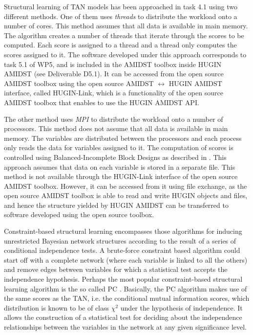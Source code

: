 Structural learning of TAN models has been approached in task 4.1 using two different methods.
One of them uses \emph{threads} to distribute the workload onto a number of cores. This method assumes that all data is 
available in main memory. The algorithm creates a number of threads that iterate through the scores to be computed. 
Each score is assigned to a thread and a thread only computes the scores assigned to it.
The software developed under this approach corresponds to task 5.1 of WP5, and is included in the AMIDST toolbox 
inside HUGIN AMIDST (see Deliverable D5.1). It can be accessed from the open source AMIDST toolbox using the 
open source AMIDST $\leftrightarrow$ HUGIN AMIDST interface, called HUGIN-Link, which is a functionality of the open
source AMIDST toolbox that  enables to use the HUGIN AMIDST API.

The other method uses \emph{MPI} \cite{For93} to distribute the workload onto a number of processors. This method 
does not assume that all data is available in main memory. The variables are distributed between the processors and each 
process only reads the data for variables assigned to it. The computation of scores is controlled using Balanced-Incomplete 
Block Designs \cite{Sti03} as described in \cite{Mad14}. This approach assumes that data on each variable is stored in a 
separate file. This method is not available through the HUGIN-Link interface of the open source AMIDST toolbox.
However, it can be accessed from it using file exchange, as the open source AMIDST toolbox is able to read and
write HUGIN objects and files, and hence the structure yielded by HUGIN AMIDST can be transferred to software developed
using the open source toolbox.

Constraint-based structural learning encompasses those algorithms for inducing unrestricted Bayesian network
structures according to the result of a series of conditional independence tests. A brute-force constraint based
algorithm could start off with a complete network (where each variable is linked to all the others) and remove edges
between variables for which a statistical test accepts the independence hypothesis. Perhaps the most popular
constraint-based structural learning algorithm is the so called PC \cite{Spi00}. Basically, the PC algorithm
makes use of the same scores as the TAN, i.e. the conditional mutual information scores, which distribution
is known to be of class $\chi^2$ under the hypothesis of independence. It allows the construction of a statistical
test for deciding about the independence relationships between the variables in the network at any given significance level.

